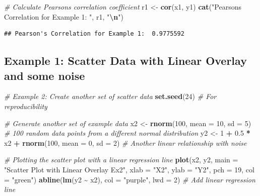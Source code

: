 \documentclass[
  12 pt,
  a4paper,
]{book}
\newenvironment{Shaded}{\begin{snugshade}}{\end{snugshade}}
\newcommand{\AttributeTok}[1]{\textcolor[rgb]{0.13,0.29,0.53}{#1}}
\newcommand{\CommentTok}[1]{\textcolor[rgb]{0.56,0.35,0.01}{\textit{#1}}}
\newcommand{\DecValTok}[1]{\textcolor[rgb]{0.00,0.00,0.81}{#1}}
\newcommand{\FloatTok}[1]{\textcolor[rgb]{0.00,0.00,0.81}{#1}}
\newcommand{\FunctionTok}[1]{\textcolor[rgb]{0.13,0.29,0.53}{\textbf{#1}}}
\newcommand{\NormalTok}[1]{#1}
\newcommand{\OtherTok}[1]{\textcolor[rgb]{0.56,0.35,0.01}{#1}}
\newcommand{\SpecialCharTok}[1]{\textcolor[rgb]{0.81,0.36,0.00}{\textbf{#1}}}
\newcommand{\StringTok}[1]{\textcolor[rgb]{0.31,0.60,0.02}{#1}}
\numberwithin{equation}{section}
\theoremstyle{plain}      %
\theoremstyle{definition} %
\theoremstyle{remark}     %
\theoremstyle{note}         %
\begin{document}
\begin{Shaded}
\begin{Highlighting}[]
\CommentTok{\# Calculate Pearson\textquotesingle{}s correlation coefficient}
\NormalTok{r1 }\OtherTok{\textless{}{-}} \FunctionTok{cor}\NormalTok{(x1, y1)}
\FunctionTok{cat}\NormalTok{(}\StringTok{"Pearson\textquotesingle{}s Correlation for Example 1: "}\NormalTok{, r1, }\StringTok{"}\SpecialCharTok{\textbackslash{}n}\StringTok{"}\NormalTok{)}
\end{Highlighting}
\end{Shaded}

\begin{verbatim}
## Pearson's Correlation for Example 1:  0.9775592
\end{verbatim}

\normalsize

\hypertarget{example-1-scatter-data-with-linear-overlay-and-some-noise}{%
\subsection{Example 1: Scatter Data with Linear Overlay and some
noise}\label{example-1-scatter-data-with-linear-overlay-and-some-noise}}

\scriptsize

\begin{Shaded}
\begin{Highlighting}[]
\CommentTok{\# Example 2: Create another set of scatter data}
\FunctionTok{set.seed}\NormalTok{(}\DecValTok{24}\NormalTok{)  }\CommentTok{\# For reproducibility}

\CommentTok{\# Generate another set of example data}
\NormalTok{x2 }\OtherTok{\textless{}{-}} \FunctionTok{rnorm}\NormalTok{(}\DecValTok{100}\NormalTok{, }\AttributeTok{mean =} \DecValTok{10}\NormalTok{, }\AttributeTok{sd =} \DecValTok{5}\NormalTok{)  }\CommentTok{\# 100 random data points from a different normal distribution}
\NormalTok{y2 }\OtherTok{\textless{}{-}} \DecValTok{1} \SpecialCharTok{+} \FloatTok{0.5} \SpecialCharTok{*}\NormalTok{ x2 }\SpecialCharTok{+} \FunctionTok{rnorm}\NormalTok{(}\DecValTok{100}\NormalTok{, }\AttributeTok{mean =} \DecValTok{0}\NormalTok{, }\AttributeTok{sd =} \DecValTok{2}\NormalTok{)  }\CommentTok{\# Another linear relationship with noise}

\CommentTok{\# Plotting the scatter plot with a linear regression line}
\FunctionTok{plot}\NormalTok{(x2, y2, }\AttributeTok{main =} \StringTok{"Scatter Plot with Linear Overlay Ex2"}\NormalTok{,}
     \AttributeTok{xlab =} \StringTok{"X2"}\NormalTok{, }\AttributeTok{ylab =} \StringTok{"Y2"}\NormalTok{, }\AttributeTok{pch =} \DecValTok{19}\NormalTok{, }\AttributeTok{col =} \StringTok{"green"}\NormalTok{)}
\FunctionTok{abline}\NormalTok{(}\FunctionTok{lm}\NormalTok{(y2 }\SpecialCharTok{\textasciitilde{}}\NormalTok{ x2), }\AttributeTok{col =} \StringTok{"purple"}\NormalTok{, }\AttributeTok{lwd =} \DecValTok{2}\NormalTok{)  }\CommentTok{\# Add linear regression line}
\end{Highlighting}
\end{Shaded}
\end{document}
